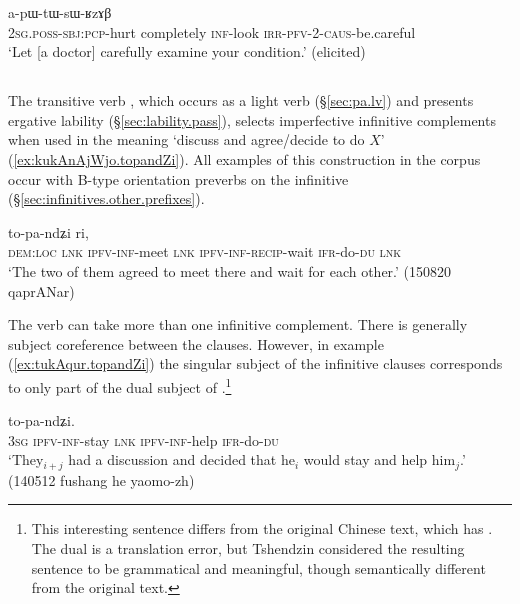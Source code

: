 \begin{exe} 
\ex \label{ex:kArtoR.apWtWsWRzAB}
 a-pɯ-tɯ-sɯ-ʁzɤβ \\
\textsc{2sg}.\textsc{poss}-\textsc{sbj}:\textsc{pcp}-hurt completely \textsc{inf}-look \textsc{irr}-\textsc{pfv}-2-\textsc{caus}-be.careful \\
\glt `Let [a doctor] carefully examine your condition.' (elicited)
\end{exe} 


\subsection{} \label{sec:pa.complements}
The transitive verb , which occurs as a light verb (§\ref{sec:pa.lv}) and presents ergative lability (§\ref{sec:lability.pass}), selects imperfective infinitive complements when used in the meaning `discuss and agree/decide to do $X$' (\ref{ex:kukAnAjWjo.topandZi}). All examples of this construction in the corpus occur with B-type orientation preverbs on the infinitive (§\ref{sec:infinitives.other.prefixes}). 

\begin{exe}
\ex \label{ex:kukAnAjWjo.topandZi}
 to-pa-ndʑi ri, \\
  \textsc{dem}:\textsc{loc} \textsc{lnk} \textsc{ipfv}-\textsc{inf}-meet \textsc{lnk} \textsc{ipfv}-\textsc{inf}-\textsc{recip}-wait \textsc{ifr}-do-\textsc{du} \textsc{lnk} \\
\glt `The two of them agreed to meet there and wait for each other.' (150820 qaprANar)
 \end{exe}
 
The verb  can take more than one infinitive complement. There is generally subject coreference between the clauses. However, in example (\ref{ex:tukAqur.topandZi}) the singular subject of the infinitive clauses corresponds to only part of the dual subject of .\footnote{This interesting sentence differs from the original Chinese text, which has . The dual  is a translation error, but Tshendzin considered the resulting sentence to be grammatical and meaningful, though semantically different from the original text. }

\begin{exe}
\ex \label{ex:tukAqur.topandZi}
 to-pa-ndʑi. \\
\textsc{3sg} \textsc{ipfv}-\textsc{inf}-stay \textsc{lnk} \textsc{ipfv}-\textsc{inf}-help \textsc{ifr}-do-\textsc{du} \\
\glt `They$_{i+j}$ had a discussion and decided that he$_i$ would stay and help him$_j$.' (140512 fushang he yaomo-zh)
\end{exe}

